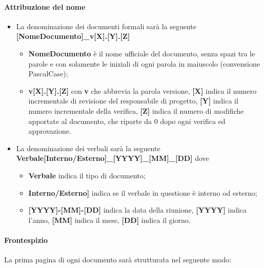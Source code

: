 \paragraph{Attribuzione del nome}
\begin{itemize}

	\item La denominazione dei documenti formali sarà la seguente \newline
	\textbf{[NomeDocumento]\_v[X].[Y].[Z]}
	\begin{itemize}
		\item \textbf{NomeDocumento} è il nome ufficiale del documento, senza spazi tra le parole e con solamente le iniziali di ogni parola in maiuscolo (convensione PascalCase);
		\item \textbf{v[X].[Y].[Z]} con \textbf{v} che abbrevia la parola versione, \textbf{[X]} indica il numero incrementale di revisione del responsabile di progetto, \textbf{[Y]} indica il numero incrementale della verifica, \textbf{[Z]} indica il numero di modifiche apportate al documento, che riparte da 0 dopo ogni verifica ed approvazione.
	\end{itemize}
	\item La denominazione dei verbali sarà la seguente\newline
	\textbf{Verbale[Interno/Esterno]\_[YYYY]\_[MM]\_[DD]}\newline
	dove
	\begin{itemize}
		\item \textbf{Verbale} indica il tipo di documento;
		\item \textbf{Interno/Esterno]} indica se il verbale in questione è interno od esterno;
		\item \textbf{[YYYY]-[MM]-[DD]}  indica la data della riunione, \textbf{[YYYY]} indica l'anno, \textbf{[MM]} indica il mese, \textbf{[DD]} indica il giorno.
	\end{itemize}
		

\end{itemize}

\paragraph{Frontespizio}    

La prima pagina di ogni documento sarà strutturata nel seguente modo:

